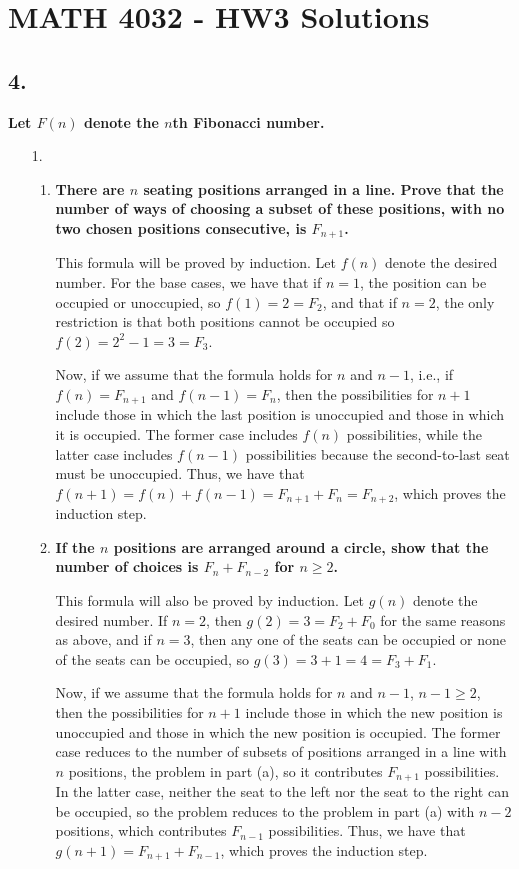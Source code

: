 \documentclass[a4paper,12pt]{article}
\begin{document}
\section*{MATH 4032 - HW3 Solutions}
\subsection*{4.}
\boldmath
\textbf{Let $F(n)$ denote the $n$th Fibonacci number.}
\unboldmath
\begin{enumerate}
    \item[1.]
        \begin{enumerate}
            \item
                \boldmath
                \textbf{There are $n$ seating positions arranged in a line. Prove that the number of ways of choosing a subset of these positions, with no two chosen positions consecutive, is $F_{n + 1}$.} \par
                \unboldmath
                This formula will be proved by induction. Let $f(n)$ denote the desired number. For the base cases, we have that if $n = 1$, the position can be occupied or unoccupied, so $f(1) = 2 = F_2$, and that if $n = 2$, the only restriction is that both positions cannot be occupied so $f(2) = 2^2 - 1 = 3 = F_3$. \par
                Now, if we assume that the formula holds for $n$ and $n - 1$, i.e., if $f(n) = F_{n + 1}$ and $f(n - 1) = F_n$, then the possibilities for $n + 1$ include those in which the last position is unoccupied and those in which it is occupied. The former case includes $f(n)$ possibilities, while the latter case includes $f(n - 1)$ possibilities because the second-to-last seat must be unoccupied. Thus, we have that $f(n + 1) = f(n) + f(n - 1) = F_{n + 1} + F_n = F_{n + 2}$, which proves the induction step.

            \item
                \boldmath
                \textbf{If the $n$ positions are arranged around a circle, show that the number of choices is $F_n + F_{n - 2}$ for $n \geq 2$.} \par
                \unboldmath
                This formula will also be proved by induction. Let $g(n)$ denote the desired number. If $n = 2$, then $g(2) = 3 = F_2 + F_0$ for the same reasons as above, and if $n = 3$, then any one of the seats can be occupied or none of the seats can be occupied, so $g(3) = 3 + 1 = 4 = F_3 + F_1$. \par
                Now, if we assume that the formula holds for $n$ and $n - 1$, $n - 1 \geq 2$, then the possibilities for $n + 1$ include those in which the new position is unoccupied and those in which the new position is occupied. The former case reduces to the number of subsets of positions arranged in a line with $n$ positions, the problem in part (a), so it contributes $F_{n + 1}$ possibilities. In the latter case, neither the seat to the left nor the seat to the right can be occupied, so the problem reduces to the problem in part (a) with $n - 2$ positions, which contributes $F_{n - 1}$ possibilities. Thus, we have that $g(n + 1) = F_{n + 1} + F_{n - 1}$, which proves the induction step.
        \end{enumerate}


\end{enumerate}
\end{document}
